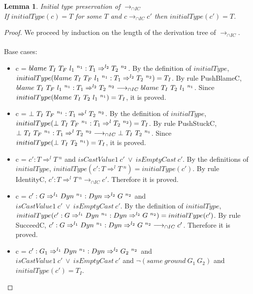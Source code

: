 \documentclass[a4paper]{article}
\newtheorem{lemma}{Lemma}
\begin{document}
\begin{lemma}
\label{initialtypepreservationIC}
Initial type preservation of $\longrightarrow_{\cap IC}$\\
If $initialType(c) = T$ for some $T$ and $c \longrightarrow_{\cap IC} c'$ then $initialType(c') = T$.
\end{lemma}
\begin{proof}
We proceed by induction on the length of the derivation tree of $\longrightarrow_{\cap IC}$.\\\\
Base cases:
\begin{itemize}
    \item c = $blame\ T_I\ T_F\ l_1\ ^{n_1} : T_1 \Rightarrow^{l_2} T_2\ ^{n_2}$.
    By the definition of $initialType$, $initialType(blame\ T_I\ T_F\ l_1\ ^{n_1} : T_1 \Rightarrow^{l_2} T_2\ ^{n_2}) = T_I$.
    By rule PushBlameC, $blame\ T_I\ T_F\ l_1\ ^{n_1} : T_1 \Rightarrow^{l_2} T_2\ ^{n_2} \longrightarrow_{\cap IC} blame\ T_I\ T_2\ l_1\ ^{n_1}$.
    Since $initialType(blame\ T_I\ T_2\ l_1\ ^{n_1}) = T_I$, it is proved.
    \item c = $\bot\ T_I\ T_F\ ^{n_1} : T_1 \Rightarrow^{l} T_2\ ^{n_2}$.
    By the definition of $initialType$, $initialType(\bot\ T_I\ T_F\ ^{n_1} : T_1 \Rightarrow^{l} T_2\ ^{n_2}) = T_I$.
    By rule PushStuckC, $\bot\ T_I\ T_F\ ^{n_1} : T_1 \Rightarrow^{l} T_2\ ^{n_2} \longrightarrow_{\cap IC} \bot\ T_I\ T_2\ ^{n_1}$.
    Since $initialType(\bot\ T_I\ T_2\ ^{n_1}) = T_I$, it is proved.
    \item c = $c' : T \Rightarrow^l T\ ^n$ and $isCastValue1\ c'\ \lor\ isEmptyCast\ c'$.
    By the definitions of $initialType$, $initialType(c' : T \Rightarrow^l T\ ^n) = initialType(c')$.
    By rule IdentityC, $c' : T \Rightarrow^l T\ ^n \longrightarrow_{\cap IC} c'$.
    Therefore it is proved.
    \item c = $c' : G \Rightarrow^{l_1} \Dyn\ ^{n_1} : \Dyn \Rightarrow^{l_2} G\ ^{n_2}$ and $isCastValue1\ c'\ \lor\ isEmptyCast\ c'$.
    By the definition of $initialType$, $initialType(c' : G \Rightarrow^{l_1} \Dyn\ ^{n_1} : \Dyn \Rightarrow^{l_2} G\ ^{n_2}) = initialType(c')$.
    By rule SucceedC, $c' : G \Rightarrow^{l_1} \Dyn\ ^{n_1} : \Dyn \Rightarrow^{l_2} G\ ^{n_2} \longrightarrow_{\cap IC} c'$.
    Therefore it is proved.
    \item c = $c' : G_1 \Rightarrow^{l_1} \Dyn\ ^{n_1} : \Dyn \Rightarrow^{l_2} G_2\ ^{n_2}$ and $isCastValue1\ c'\ \lor\ isEmptyCast\ c'$ and $\neg(same\ ground\ G_1\ G_2)$ and $initialType(c') = T_I$.

\end{itemize}
\end{proof}
\end{document}
